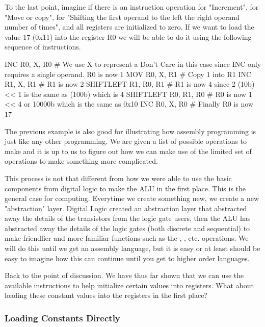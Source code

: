 To the last point, imagine if there is an instruction operation  for "Increment",  for "Move or copy",  for "Shifting the first operand to the left the right operand number of times", and all registers are initialized to zero. If we want to load the value 17 (0x11) into the register R0 we will be able to do it using the following sequence of instructions.

\begin{code}
INC R0, X, R0 # We use X to represent a Don't Care in this case since INC only requires a single operand. R0 is now 1
MOV R0, X, R1 # Copy 1 into R1
INC R1, X, R1 # R1 is now 2
SHIFTLEFT R1, R0, R1 # R1 is now 4 since 2 (10b) << 1 is the same as (100b) which is 4
SHIFTLEFT R0, R1, R0 # R0 is now 1 << 4 or 10000b which is the same as 0x10
INC R0, X, R0 # Finally R0 is now 17
\end{code}

The previous example is also good for illustrating how assembly programming is just like any other programming. We are given a list of possible operations to make and it is up to us to figure out how we can make use of the limited set of operations to make something more complicated. 

This process is not that different from how we were able to use the basic components from digital logic to make the ALU in the first place. This is the general case for computing. Everytime we create something new, we create a new "abstraction" layer. Digital Logic created an abstraction layer that abstracted away the details of the transistors from the logic gate users, then the ALU has abstracted away the details of the logic gates (both discrete and sequential) to make friendlier and more familiar functions such as the , , etc. operations. We will do this until we get an assembly language, but it is easy or at least should be easy to imagine how this can continue until you get to higher order languages. 

Back to the point of discussion. We have thus far shown that we can use the available instructions to help initialize certain values into registers. What about loading these constant values into the registers in the first place?

\subsubsection{Loading Constants Directly}

